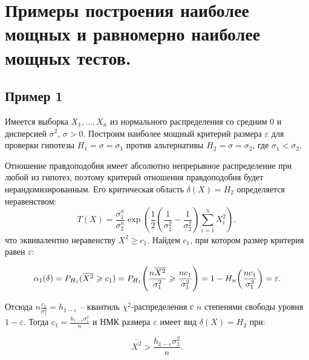 \section{Примеры построения наиболее мощных и равномерно наиболее мощных тестов.}

\subsection{Пример 1}
Имеется выборка $X_1, ..., X_n$ из нормального распределения со средним $0$ и дисперсией $\sigma^2$, $\sigma > 0$. Построим наиболее мощный критерий размера $\varepsilon$ для проверки гипотезы $H_1 = {\sigma = \sigma_1}$ против альтернативы $H_2 = {\sigma = \sigma_2}$, где $\sigma_1 < \sigma_2$.

Отношение правдоподобия имеет абсолютно непрерывное распределение при любой из 
гипотез, поэтому критерий отношения правдоподобия будет нерандомизированным. 
Его критическая область $\delta(X) = H_2$ определяется неравенством:
\[
    T(X) = \frac{\sigma^n_1}{\sigma^n_2} \exp{\left(\frac{1}{2}\left(\frac{1}
    {\sigma^2_1} - \frac{1}{\sigma^2_2}\right)\sum_{i = 1}^{n}{X^2_i}\right)}
,\]
что эквивалентно неравенству $\overline{X^2} \geqslant c_1$. Найдем $c_1$, при 
котором размер критерия равен $\varepsilon$:

\[
	\alpha_{1}(\delta) = P_{H_1}(\overline{X^2} \geqslant c_1) = 
    P_{H_1}\parens*{\frac{n\overline{X^2}}{\sigma^2_1} \geqslant 
    \frac{nc_1}{\sigma^2_1}} = 1 - H_n\parens*{\frac{nc_1}{\sigma^2_1}} = 
    \varepsilon
.\]

Отсюда $n \frac{c_1}{\sigma^2_{1}} = h_{1-\varepsilon}$ -- квантиль $\chi^2$-распределения с $n$ степенями свободы уровня $1 - \varepsilon$. Тогда $c_1 = \frac{h_{1 - \varepsilon}\sigma^2_{1}}{n}$ и НМК размера $\varepsilon$ имеет вид $\delta(X) = H_2$ при:

\[
	\overline{X^2} > \frac{h_{1 - \varepsilon}\sigma^2_{1}}{n}
.\]

